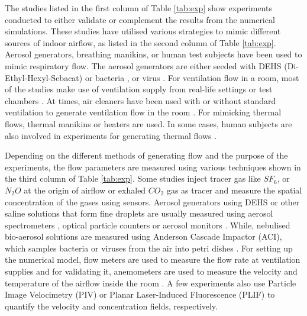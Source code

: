 \documentclass[a4paper,12pt]{elsarticle}
\begin{document}
The studies listed in the first column of Table \ref{tab:exp} show experiments conducted to either validate or complement the results from the numerical simulations. These studies have utilised various strategies to mimic different sources of indoor airflow, as listed in the second column of Table \ref{tab:exp}. Aerosol generators, breathing manikins, or human test subjects have been used to mimic respiratory flow. The aerosol generators are either seeded with DEHS (Di-Ethyl-Hexyl-Sebacat) \cite{jain2023numerical} or bacteria \cite{liu2020full}, or virus \cite{oksanen2022combining}. For ventilation flow in a room, most of the studies make use of ventilation supply from real-life settings \cite{romano2015numerical,duill2021impact} or test chambers \cite{zhang2019distribution, berrouk2010experimental}. At times, air cleaners have been used with or without standard ventilation to generate ventilation flow in the room \cite{oksanen2022combining, jain2023numerical}. For mimicking thermal flows, thermal manikins \cite{li2021effects} or heaters \cite{ho2021modeling} are used. In some cases, human subjects are also involved in experiments for generating thermal flows \cite{li2005role, deng2021control}.

Depending on the different methods of generating flow and the purpose of the experiments, the flow parameters are measured using various techniques shown in the third column of Table \ref{tab:exp}. Some studies inject tracer gas like $SF_6$, or $N_2O$ at the origin of airflow \cite{qian2008dispersion, cheng2021experimental} or exhaled $CO_2$ gas as tracer \cite{deng2021control} and measure the spatial concentration of the gases using sensors. Aerosol generators using DEHS or other saline solutions that form fine droplets are usually measured using aerosol spectrometers \cite{duill2021impact}, optical particle counters \cite{berrouk2010experimental} or aerosol monitors \cite{zhou2021experimental}. While, nebulised bio-aerosol solutions are measured using Anderson Cascade Impactor (ACI), which samples bacteria or viruses from the air into petri dishes \cite{liu2020full,liu2020experimental}. For setting up the numerical model, flow meters are used to measure the flow rate at ventilation supplies \cite{li2005role,liu2023estimating} and for validating it, anemometers are used to measure the velocity and temperature of the airflow inside the room \cite{li2023numerical,arpino2023cfd}. A few experiments also use Particle Image Velocimetry (PIV) \cite{faleiros2022tu} or Planar Laser-Induced Fluorescence (PLIF) \cite{poussou2010flow} to quantify the velocity and concentration fields, respectively.
\end{document}
